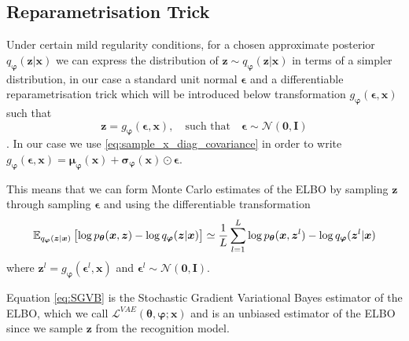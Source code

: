 \subsection{Reparametrisation Trick}
Under certain mild regularity conditions, for a chosen approximate posterior
$q_{\bm{\varphi}}(\bm{z} | \bm{x})$ we can express the distribution of $\bm{z}
\sim q_{\bm{\varphi}}(\bm{z} | \bm{x})$ in terms of a simpler distribution, in
our case a standard unit normal $\bm{\epsilon}$ and a differentiable
reparametrisation trick which will be introduced below
\cite{kingma_auto-encoding_2013} transformation $g_{\bm{\varphi}}(\bm{\epsilon},
\bm{x})$ such that
\begin{equation}
  \label{eq:reparametrisation_trick}
  \bm{z} = g_{\bm{\varphi}}(\bm{\epsilon}, \bm{x}), \quad \text{such that} \quad \bm{\epsilon} \sim \mathcal{N}(\bm{0}, \bm{I})
\end{equation}.
In our case we use \eqref{eq:sample_x_diag_covariance} in order to write
$g_{\bm{\varphi}}(\bm{\epsilon}, \bm{x}) = \bm{\mu}_{\bm{\varphi}}(\bm{x}) +
\bm{\sigma}_{\bm{\varphi}}(\bm{x}) \odot \bm{\epsilon}$.

This means that we can form Monte Carlo estimates of the ELBO by sampling
$\bm{z}$ through sampling $\bm{\epsilon}$ and using the differentiable
transformation
\begin{equation}
  \label{eq:SGVB}
    \operatorname{\mathbb{E}}_{q_{\bm{\varphi}}(\bm{z} | \bm{x})} \left[ \log p_{\bm{\theta}}(\bm{x},  \bm{z}) - \log q_{\bm{\varphi}}(\bm{z} | \bm{x}) \right] \simeq \frac{1}{L} \sum_{l=1}^L \log p_{\bm{\theta}}(\bm{x},  \bm{z}^{l}) - \log q_{\bm{\varphi}}(\bm{z}^{l} | \bm{x})
\end{equation}
where $\bm{z}^{l} = g_{\bm{\varphi}}(\bm{\epsilon}^{l}, \bm{x})$ and
$\bm{\epsilon}^{l} \sim \mathcal{N}(\bm{0}, \bm{I})$.

Equation \eqref{eq:SGVB} is the Stochastic Gradient Variational Bayes estimator
of the ELBO, which we call $\mathcal{L}^{VAE}(\bm{\theta}, \bm{\varphi};
\bm{x})$ and is an unbiased estimator of the ELBO since we sample $\bm{z}$ from
the recognition model.

